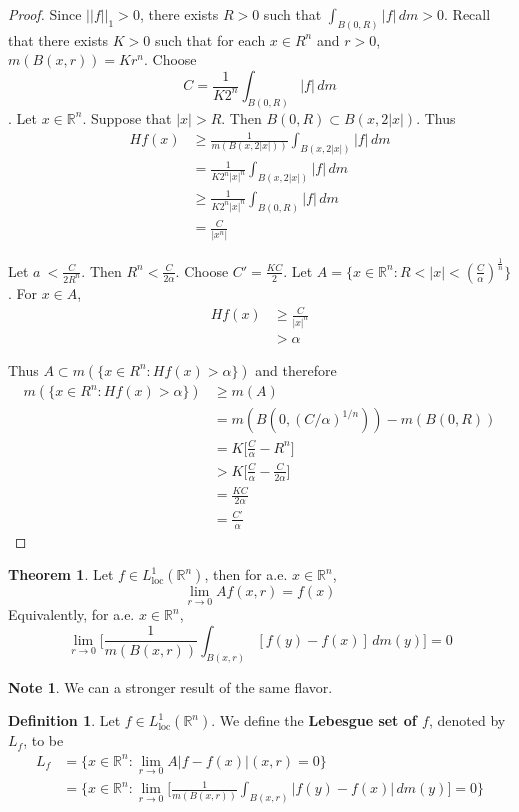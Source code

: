 \documentclass{book}
\theoremstyle{definition}
\newtheorem{defn}[definition]{Definition}
\newtheorem{note}[definition]{Note}
\newtheorem{thm}[definition]{Theorem}
\newcommand{\al}{\alpha}
\newcommand{\R}{\mathbb{R}}
\newcommand{\ld}[1]{\label{defn:#1}}
\DeclareMathOperator*{\0}{\mbf{0}}
\DeclareMathOperator*{\1}{\mbf{1}}
\newcommand{\dm}{\, d m}
\newcommand{\Ll}{L^1_{\text{loc}}(\R^n)}
\begin{document}
	\begin{proof}
		Since $||f||_1 >0$, there exists $R>0$ such that $\int_{B(0,R)}|f|\dm >0$. Recall that there exists $K>0$ such that for each $x \in R^n$ and $r>0$, $m(B(x,r)) = Kr^n$. Choose $$C = \frac{1}{K2^n}\int_{B(0,R)}|f| \dm$$. Let $x \in \R^n$. Suppose that $|x|>R$. Then $B(0,R) \subset B(x,2|x|)$. Thus 
		\begin{align*}
			Hf(x) 
			&\geq \frac{1}{m(B(x,2|x|))}\int_{B(x,2|x|)}|f|\dm\\
			&= \frac{1}{K2^n|x|^n}\int_{B(x,2|x|)}|f|\dm \\
			&\geq \frac{1}{K2^n|x|^n}\int_{B(0,R)}|f|\dm \\
			&= \frac{C}{|x^n|}
		\end{align*}
		
		Let $a\ < \frac{C}{2R^n}$. Then $R^n < \frac{C}{2 \al}$. Choose $C' =\frac{KC}{2}$. Let $A = \{x \in \R^n: R < |x|< (\frac{C}{\al})^{\frac{1}{n}}\}$. For $x \in A$, 
		\begin{align*}
			Hf(x) 
			&\geq \frac{C}{|x|^n} \\
			& > \al
		\end{align*}
		
		Thus $A \subset m(\{x \in R^n: Hf(x)> \al\})$ and therefore 
		\begin{align*}
			m(\{x \in R^n: Hf(x)> \al\}) 
			&\geq m(A) \\
			&= m(B(0,(C/\al)^{1/n})) - m(B(0,R)) \\
			&= K\bigg [\frac{C}{\al} - R^n \bigg] \\
			&> K\bigg[\frac{C}{\al} - \frac{C}{2 \al}\bigg] \\
			&= \frac{KC}{2 \al}\\
			&= \frac{C'}{\al}
		\end{align*}
	\end{proof}
	
	\begin{thm}
		Let $f \in \Ll$, then for a.e. $x \in \R^n$, $$\lim_{r \rightarrow 0} Af(x,r) =f(x)$$ 
		Equivalently, for a.e. $x \in \R^n$, $$ \lim_{r \rightarrow 0} \bigg[ \frac{1}{m(B(x,r))}\int_{B(x,r)}[f(y)-f(x)]\dm(y)\bigg] =0$$
	\end{thm}
	
	\begin{note}
		We can a stronger result of the same flavor.
	\end{note}
	
	\begin{defn} \ld{00000} 
		Let $f \in \Ll$. We define the \textbf{Lebesgue set of $f$}, denoted by $L_f$, to be 
		\begin{align*}
			L_f 
			&= \{x \in \R^n: \lim_{r \rightarrow 0} A|f-f(x)|(x,r) =0 \}\\
			&= \bigg \{x \in \R^n: \lim_{r \rightarrow 0} \bigg[ \frac{1}{m(B(x,r))}\int_{B(x,r)}|f(y) - f(x)|\dm(y)\bigg] =0 \bigg \}
		\end{align*}
	\end{defn}
	
\end{document}
